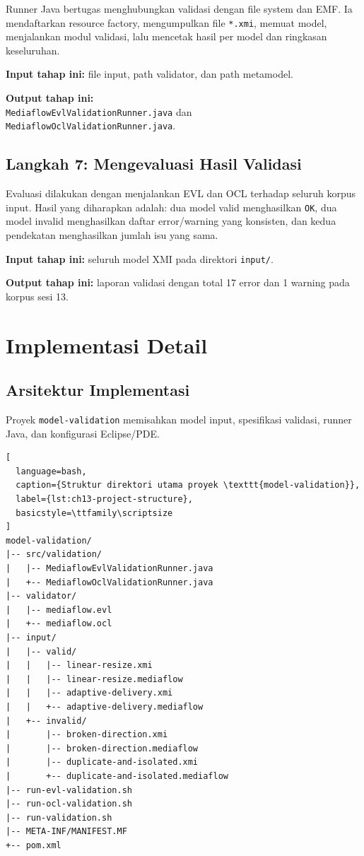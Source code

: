 Runner Java bertugas menghubungkan validasi dengan file system dan EMF. Ia mendaftarkan resource factory, mengumpulkan file \texttt{*.xmi}, memuat model, menjalankan modul validasi, lalu mencetak hasil per model dan ringkasan keseluruhan.

\textbf{Input tahap ini:} file input, path validator, dan path metamodel.

\textbf{Output tahap ini:}\\
\texttt{MediaflowEvlValidationRunner.java} dan\\
\texttt{MediaflowOclValidationRunner.java}.

\subsection{Langkah 7: Mengevaluasi Hasil Validasi}

Evaluasi dilakukan dengan menjalankan EVL dan OCL terhadap seluruh korpus input. Hasil yang diharapkan adalah: dua model valid menghasilkan \texttt{OK}, dua model invalid menghasilkan daftar error/warning yang konsisten, dan kedua pendekatan menghasilkan jumlah isu yang sama.

\textbf{Input tahap ini:} seluruh model XMI pada direktori \texttt{input/}.

\textbf{Output tahap ini:} laporan validasi dengan total 17 error dan 1 warning pada korpus sesi 13.

\section{Implementasi Detail}

\subsection{Arsitektur Implementasi}

Proyek \texttt{model-validation} memisahkan model input, spesifikasi validasi, runner Java, dan konfigurasi Eclipse/PDE.

\begin{lstlisting}[
  language=bash,
  caption={Struktur direktori utama proyek \texttt{model-validation}},
  label={lst:ch13-project-structure},
  basicstyle=\ttfamily\scriptsize
]
model-validation/
|-- src/validation/
|   |-- MediaflowEvlValidationRunner.java
|   +-- MediaflowOclValidationRunner.java
|-- validator/
|   |-- mediaflow.evl
|   +-- mediaflow.ocl
|-- input/
|   |-- valid/
|   |   |-- linear-resize.xmi
|   |   |-- linear-resize.mediaflow
|   |   |-- adaptive-delivery.xmi
|   |   +-- adaptive-delivery.mediaflow
|   +-- invalid/
|       |-- broken-direction.xmi
|       |-- broken-direction.mediaflow
|       |-- duplicate-and-isolated.xmi
|       +-- duplicate-and-isolated.mediaflow
|-- run-evl-validation.sh
|-- run-ocl-validation.sh
|-- run-validation.sh
|-- META-INF/MANIFEST.MF
+-- pom.xml
\end{lstlisting}

